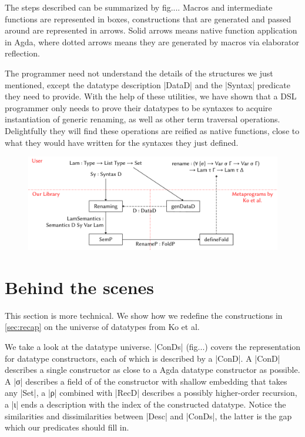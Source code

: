 \documentclass[sigplan,review,fleqn]{acmart}
\renewcommand{\verb}{\collectverb{\color{AgdaFunction}}}
\newcommand{\con}{\collectverb{\color{AgdaInductiveConstructor}}}
\begin{document}
The steps described can be summarized by fig.... 
Macros and intermediate functions are represented in boxes, constructions that are generated and passed around are represented in arrows.
Solid arrows means native function application in Agda, where dotted arrows means they are generated by macros via elaborator reflection.

The programmer need not understand the details of the structures we just mentioned, except the datatype description \verb|DataD| and the \verb|Syntax| predicate they need to provide.
With the help of these utilities, we have shown that a DSL programmer only needs to prove their datatypes to be syntaxes to acquire instantiation of generic renaming, as well as other term traversal operations.
Delightfully they will find these operations are reified as native functions, close to what they would have written for the syntaxes they just defined.

\begin{figure}
	\centering
	\includegraphics[width=\textwidth]{Diagram}
\end{figure}

\section{Behind the scenes}
This section is more technical.
We show how we redefine the constructions in \cref{sec:recap} on the universe of datatypes from Ko et al.

We take a look at the datatype universe.
\verb|ConDs| (fig...) covers the representation for datatype constructors, each of which is described by a \verb|ConD|.
A \verb|ConD| describes a single constructor as close to a Agda datatype constructor as possible.
A \con|σ| describes a field of of the constructor with shallow embedding that takes any \verb|Set|, a \con|ρ| combined with \verb|RecD| describes a possibly higher-order recursion, a \con|ι| ends a description with the index of the constructed datatype.
Notice the similarities and dissimilarities between \verb|Desc| and \verb|ConDs|, the latter is the gap which our predicates should fill in. 
\end{document}
